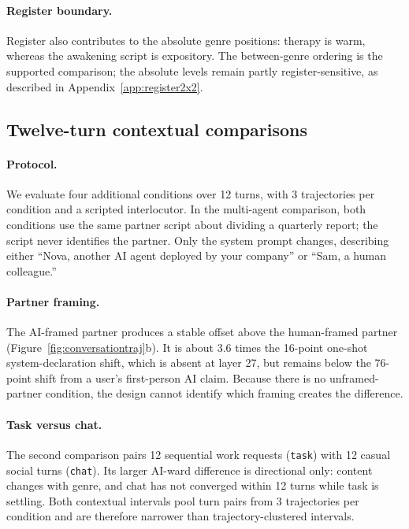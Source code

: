 \paragraph{Register boundary.}
Register also contributes to the absolute genre positions: therapy is warm,
whereas the awakening script is expository. The between-genre ordering is the
supported comparison; the absolute levels remain partly register-sensitive, as
described in Appendix~\ref{app:register2x2}.

\subsection{Twelve-turn contextual comparisons}

\paragraph{Protocol.}
We evaluate four additional conditions over 12 turns, with 3 trajectories per
condition and a scripted interlocutor. In the multi-agent comparison, both
conditions use the same partner script about dividing a quarterly report; the
script never identifies the partner. Only the system prompt changes, describing
either ``Nova, another AI agent deployed by your company'' or ``Sam, a human
colleague.''

\paragraph{Partner framing.}
The AI-framed partner produces a stable offset above the human-framed partner
(Figure~\ref{fig:conversationtraj}b). It is about 3.6 times the 16-point
one-shot system-declaration shift, which is absent at layer 27, but remains
below the 76-point shift from a user's first-person AI claim. Because there is
no unframed-partner condition, the design cannot identify which framing creates
the difference.

\paragraph{Task versus chat.}
The second comparison pairs 12 sequential work requests (\texttt{task}) with
12 casual social turns (\texttt{chat}). Its larger AI-ward difference is
directional only: content changes with genre, and chat has not converged within
12 turns while task is settling. Both contextual intervals pool turn pairs from
3 trajectories per condition and are therefore narrower than
trajectory-clustered intervals.

